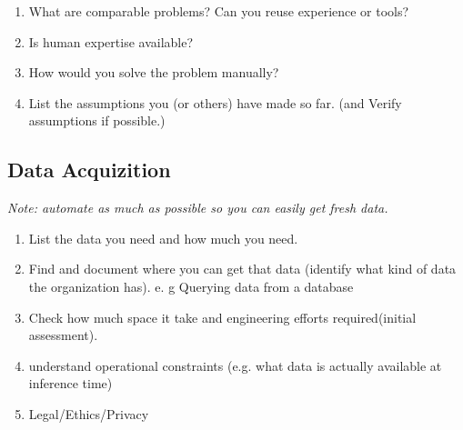 \documentclass[openany]{book}
\begin{document}
\begin{enumerate}
    \item What are comparable problems? Can you reuse experience or tools?
    
    \item Is human expertise available?
    
    \item How would you solve the problem manually?
    
    \item  List the assumptions you (or others) have made so far. (and  Verify assumptions if possible.)

\end{enumerate}


\subsection{Data Acquizition} 

\textit{Note: automate as much as possible so you can easily get fresh data.
}

\begin{enumerate}

    \item List the data you need and how much you need.
    \item  Find and document where you can get that data (identify what kind of data the organization has). e. g Querying data from a database
    \item Check how much space it take and engineering efforts required(initial assessment). 
    
    \item  understand operational constraints (e.g. what data is actually available at inference time)
    
    \item  Legal/Ethics/Privacy
    
    
\end{enumerate}
\end{document}
